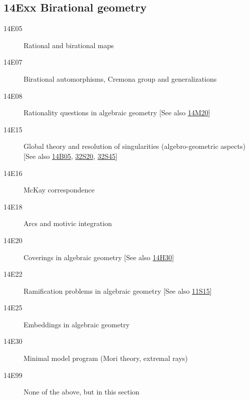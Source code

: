\documentclass[letterpaper]{article}
\begin{document}
\subsection*{14Exx Birational geometry }\label{14Exx}
\begin{description}               
\item [14E05]\label{14E05} Rational and birational maps
\item [14E07]\label{14E07} Birational automorphisms, Cremona group and generalizations
\item [14E08]\label{14E08} Rationality questions in algebraic geometry [See also \hyperref[14M20]{14M20}]
\item [14E15]\label{14E15} Global theory and resolution of singularities (algebro-geometric aspects) [See also \hyperref[14B05]{14B05}, \hyperref[32S20]{32S20}, \hyperref[32S45]{32S45}]
\item [14E16]\label{14E16} McKay correspondence
\item [14E18]\label{14E18} Arcs and motivic integration
\item [14E20]\label{14E20} Coverings in algebraic geometry [See also \hyperref[14H30]{14H30}]
\item [14E22]\label{14E22} Ramification problems in algebraic geometry [See also \hyperref[11S15]{11S15}]
\item [14E25]\label{14E25} Embeddings in algebraic geometry
\item [14E30]\label{14E30} Minimal model program (Mori theory, extremal rays)
\item [14E99]\label{14E99} None of the above, but in this section
\end{description}
\end{document}
